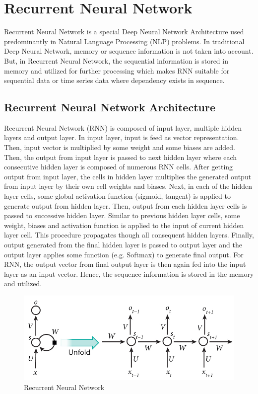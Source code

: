 \documentclass[a4paper,12pt]{report}
\begin{document}
\section {Recurrent Neural Network}
Recurrent Neural Network is a special Deep Neural Network Architecture used predominantly in Natural Language Processing (NLP) problems. In traditional Deep Neural Network, memory or sequence information is not taken into account. But, in Recurrent Neural Network, the sequential information is stored in memory and utilized for further processing which makes RNN suitable for sequential data or time series data where dependency exists in sequence.
\subsection {Recurrent Neural Network Architecture}
Recurrent Neural Network (RNN) is composed of input layer, multiple hidden layers and output layer. In input layer, input is feed as vector representation. Then, input vector is multiplied by some weight and some biases are added. Then, the output from input layer is passed to next hidden layer where each consecutive hidden layer is composed of numerous RNN cells. After getting output from input layer, the cells in hidden layer multiplies the generated output from input layer by their own cell weights and biases. Next, in each of the hidden layer cells, some global activation function (sigmoid, tangent) is applied to generate output from hidden layer. Then, output from each hidden layer cells is passed to successive hidden layer. Similar to previous hidden layer cells, some weight, biases and activation function is applied to the input of current hidden layer cell. This procedure propagates though all consequent hidden layers. Finally, output generated from the final hidden layer is passed to output layer and the output layer applies some function (e.g. Softmax) to generate final output. For RNN, the output vector from final output layer is then again fed into the input layer as an input vector. Hence, the sequence information is stored in the memory and utilized. 
\begin{figure}[H]
\begin{center}
\includegraphics[scale=.25]{rnn1}
\caption{Recurrent Neural Network}
\end{center}
\end{figure}
\end{document}
